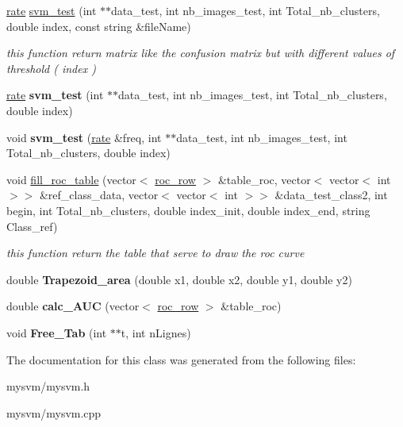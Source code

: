\begin{DoxyCompactItemize}
\item 
\hypertarget{classmysvm_ac6be37ca40eacb678a558a44015846f5}{
\hyperlink{classrate}{rate} \hyperlink{classmysvm_ac6be37ca40eacb678a558a44015846f5}{svm\_\-test} (int $\ast$$\ast$data\_\-test, int nb\_\-images\_\-test, int Total\_\-nb\_\-clusters, double index, const string \&fileName)}
\label{classmysvm_ac6be37ca40eacb678a558a44015846f5}

\begin{DoxyCompactList}\small\item\em this function return matrix like the confusion matrix but with different values of threshold ( index ) \end{DoxyCompactList}\item 
\hypertarget{classmysvm_a70569f393920b4f27c05c14022935b94}{
\hyperlink{classrate}{rate} {\bfseries svm\_\-test} (int $\ast$$\ast$data\_\-test, int nb\_\-images\_\-test, int Total\_\-nb\_\-clusters, double index)}
\label{classmysvm_a70569f393920b4f27c05c14022935b94}

\item 
\hypertarget{classmysvm_a98ae7f2857912c8d16921d8e36a82104}{
void {\bfseries svm\_\-test} (\hyperlink{classrate}{rate} \&freq, int $\ast$$\ast$data\_\-test, int nb\_\-images\_\-test, int Total\_\-nb\_\-clusters, double index)}
\label{classmysvm_a98ae7f2857912c8d16921d8e36a82104}

\item 
\hypertarget{classmysvm_a8f94ef414ea347f621b59f09b07d08cb}{
void \hyperlink{classmysvm_a8f94ef414ea347f621b59f09b07d08cb}{fill\_\-roc\_\-table} (vector$<$ \hyperlink{classroc__row}{roc\_\-row} $>$ \&table\_\-roc, vector$<$ vector$<$ int $>$$>$ \&ref\_\-class\_\-data, vector$<$ vector$<$ int $>$$>$ \&data\_\-test\_\-class2, int begin, int Total\_\-nb\_\-clusters, double index\_\-init, double index\_\-end, string Class\_\-ref)}
\label{classmysvm_a8f94ef414ea347f621b59f09b07d08cb}

\begin{DoxyCompactList}\small\item\em this function return the table that serve to draw the roc curve \end{DoxyCompactList}\item 
\hypertarget{classmysvm_a6331d18ad38f5e66097f0dd6957af972}{
double {\bfseries Trapezoid\_\-area} (double x1, double x2, double y1, double y2)}
\label{classmysvm_a6331d18ad38f5e66097f0dd6957af972}

\item 
\hypertarget{classmysvm_a6e98d9cb804b9d895c7d472968c720f6}{
double {\bfseries calc\_\-AUC} (vector$<$ \hyperlink{classroc__row}{roc\_\-row} $>$ \&table\_\-roc)}
\label{classmysvm_a6e98d9cb804b9d895c7d472968c720f6}

\item 
\hypertarget{classmysvm_a0f1956b65d20d02574f8ed85bddaf76d}{
void {\bfseries Free\_\-Tab} (int $\ast$$\ast$t, int nLignes)}
\label{classmysvm_a0f1956b65d20d02574f8ed85bddaf76d}

\end{DoxyCompactItemize}


The documentation for this class was generated from the following files:\begin{DoxyCompactItemize}
\item 
mysvm/mysvm.h\item 
mysvm/mysvm.cpp\end{DoxyCompactItemize}
